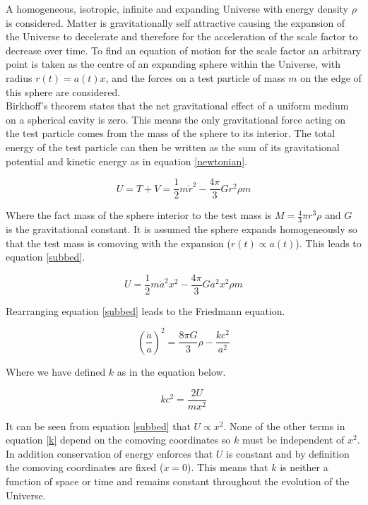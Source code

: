 \documentclass[12pt]{article} %
\begin{document}
A homogeneous, isotropic, infinite and expanding Universe with energy density $\rho$ is considered\cite{mukhanov}. Matter is gravitationally self attractive causing the expansion of the Universe to decelerate and therefore for the acceleration of the scale factor to decrease over time.  To find an equation of motion for the scale factor an arbitrary point is taken as the centre of an expanding sphere within the Universe, with radius $r(t)=a(t)x$, and the forces on a test particle of mass $m$ on the edge of this sphere are considered\cite{pritchard}.\\

Birkhoff's theorem states that the net gravitational effect of a uniform medium on a spherical cavity is zero. This means the only gravitational force acting on the test particle comes from the mass of the sphere to its interior\cite{cambridge}. The total energy of the test particle can then be written as the sum of its gravitational potential and kinetic energy as in equation \ref{newtonian}.

\begin{equation}\label{newtonian}
U = T + V = \frac{1}{2}m\dot r^2 -\frac{4\pi}{3}G r^2 \rho m
\end{equation}

Where the fact mass of the sphere interior to the test mass is $M=\frac{4}{3}\pi r^3 \rho$ and $G$ is the gravitational constant. It is assumed the sphere expands homogeneously so that the test mass is comoving with the expansion ($r(t) \propto a(t)$). This leads to equation \ref{subbed}.

\begin{equation}\label{subbed}
U = \frac{1}{2}m\dot a^2 x^2 -\frac{4\pi}{3}G a^2 x^2 \rho m 
\end{equation}

Rearranging equation \ref{subbed} leads to the Friedmann equation.

\begin{equation}\label{friedmann}
\left( \frac{\dot a}{a} \right) ^2 = \frac{8\pi G}{3}\rho - \frac{k c^2}{a^2}
\end{equation}

Where we have defined $k$ as in the equation below.

\begin{equation}\label{k}
k c^2 = \frac{2U}{m x^2}
\end{equation}

It can be seen from equation \ref{subbed} that $U \propto x^2$. None of the other terms in equation \ref{k} depend on the comoving coordinates so $k$ must be independent of  $ x^2$. In addition conservation of energy enforces that $U$ is constant and by definition the comoving coordinates are fixed ($\dot x = 0$). This means that $k$ is neither a function of space or time and remains constant throughout the evolution of the Universe. \\
\end{document}

